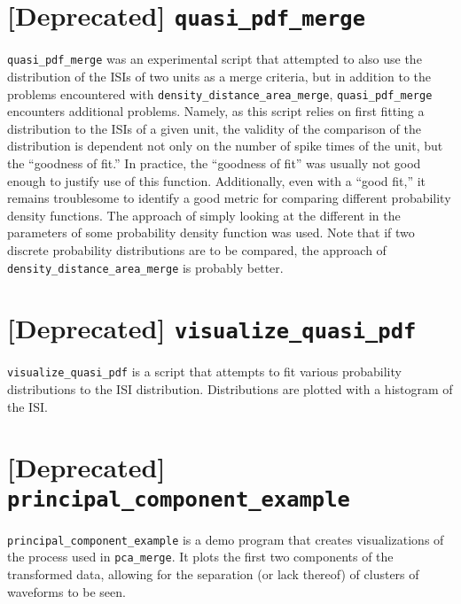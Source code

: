 \documentclass{article}
\begin{document}
\section{[Deprecated] \texttt{quasi\_pdf\_merge}}
\texttt{quasi\_pdf\_merge} was an experimental script that attempted to
also use the distribution of the ISIs of two units as a merge criteria,
but in addition to the problems encountered with
\texttt{density\_distance\_area\_merge}, \texttt{quasi\_pdf\_merge}
encounters additional problems. Namely, as this script relies on first
fitting a distribution to the ISIs of a given unit, the validity of the
comparison of the distribution is dependent not only on the number of
spike times of the unit, but the ``goodness of fit.'' In practice, the
``goodness of fit'' was usually not good enough to justify use of this
function. Additionally, even with a ``good fit,'' it remains troublesome
to identify a good metric for comparing different probability density
functions. The approach of simply looking at the different in the
parameters of some probability density function was used. Note that if
two discrete probability distributions are to be compared, the approach
of \texttt{density\_distance\_area\_merge} is probably better.

\section{[Deprecated] \texttt{visualize\_quasi\_pdf}}
\texttt{visualize\_quasi\_pdf} is a script that attempts to fit various
probability distributions to the ISI distribution. Distributions are
plotted with a histogram of the ISI.

\section{[Deprecated] \texttt{principal\_component\_example}}
\texttt{principal\_component\_example} is a demo program that creates
visualizations of the process used in \texttt{pca\_merge}. It plots the
first two components of the transformed data, allowing for the
separation (or lack thereof) of clusters of waveforms to be seen.
\end{document}
